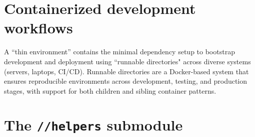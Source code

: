 \section{Containerized development workflows}


A ``thin environment'' contains the minimal dependency setup to bootstrap
development and deployment using ``runnable directories" 
across diverse systems (servers, laptops, CI/CD). Runnable directories are a
Docker-based system that ensures reproducible environments across development,
testing, and production stages, with support for both children and sibling
container patterns.


\section{The \texttt{//helpers} submodule}


